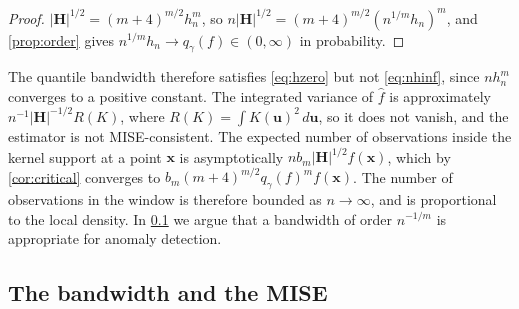 \begin{proof}
  $|\bm{H}|^{1/2}=(m+4)^{m/2}h_n^m$, so $n|\bm{H}|^{1/2}=(m+4)^{m/2}(n^{1/m}h_n)^m$, and \cref{prop:order} gives $n^{1/m}h_n\to q_\gamma(f)\in(0,\infty)$ in probability.
\end{proof}

The quantile bandwidth therefore satisfies \eqref{eq:hzero} but not \eqref{eq:nhinf}, since $nh_n^m$ converges to a positive constant. The integrated variance of $\hat f$ is approximately $n^{-1}|\bm{H}|^{-1/2}R(K)$, where $R(K)=\int K(\bm{u})^2\,d\bm{u}$, so it does not vanish, and the estimator is not MISE-consistent. The expected number of observations inside the kernel support at a point $\bm{x}$ is asymptotically $nb_m|\bm{H}|^{1/2}f(\bm{x})$, which by \cref{cor:critical} converges to $b_m(m+4)^{m/2}q_\gamma(f)^mf(\bm{x})$. The number of observations in the window is therefore bounded as $n\to\infty$, and is proportional to the local density. In \cref{sec:whynotmise} we argue that a bandwidth of order $n^{-1/m}$ is appropriate for anomaly detection.

\subsection{The bandwidth and the MISE}\label{sec:whynotmise}

